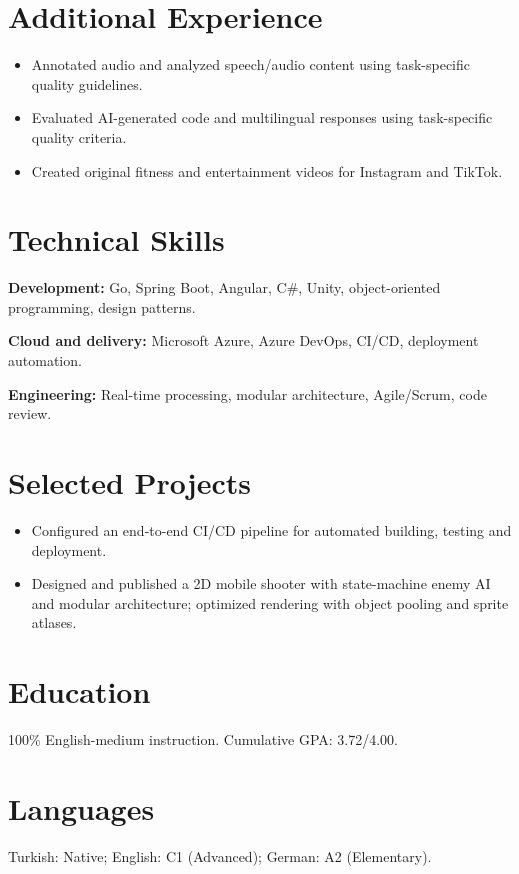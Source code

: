 \documentclass[10pt,a4paper]{article}
\begin{document}
\section{Additional Experience}
\begin{itemize}
  \item Annotated audio and analyzed speech/audio content using task-specific quality guidelines.
\end{itemize}
\begin{itemize}
  \item Evaluated AI-generated code and multilingual responses using task-specific quality criteria.
\end{itemize}
\begin{itemize}
  \item Created original fitness and entertainment videos for Instagram and TikTok.
\end{itemize}

\section{Technical Skills}
\textbf{Development:} Go, Spring Boot, Angular, C\#, Unity, object-oriented programming, design patterns.\par
\textbf{Cloud and delivery:} Microsoft Azure, Azure DevOps, CI/CD, deployment automation.\par
\textbf{Engineering:} Real-time processing, modular architecture, Agile/Scrum, code review.

\section{Selected Projects}
\begin{itemize}
  \item Configured an end-to-end CI/CD pipeline for automated building, testing and deployment.
\end{itemize}
\begin{itemize}
  \item Designed and published a 2D mobile shooter with state-machine enemy AI and modular architecture;
        optimized rendering with object pooling and sprite atlases.
\end{itemize}

\section{Education}
100\% English-medium instruction. Cumulative GPA: 3.72/4.00.

\section{Languages}
Turkish: Native; English: C1 (Advanced); German: A2 (Elementary).
\end{document}
